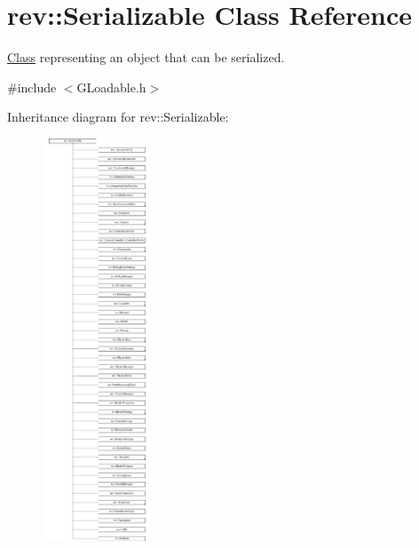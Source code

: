 \hypertarget{classrev_1_1_serializable}{}\section{rev\+::Serializable Class Reference}
\label{classrev_1_1_serializable}


\mbox{\hyperlink{struct_class}{Class}} representing an object that can be serialized.  




{\ttfamily \#include $<$G\+Loadable.\+h$>$}

Inheritance diagram for rev\+::Serializable\+:\begin{figure}[H]
\begin{center}
\leavevmode
\includegraphics[height=12.000000cm]{classrev_1_1_serializable}
\end{center}
\end{figure}
